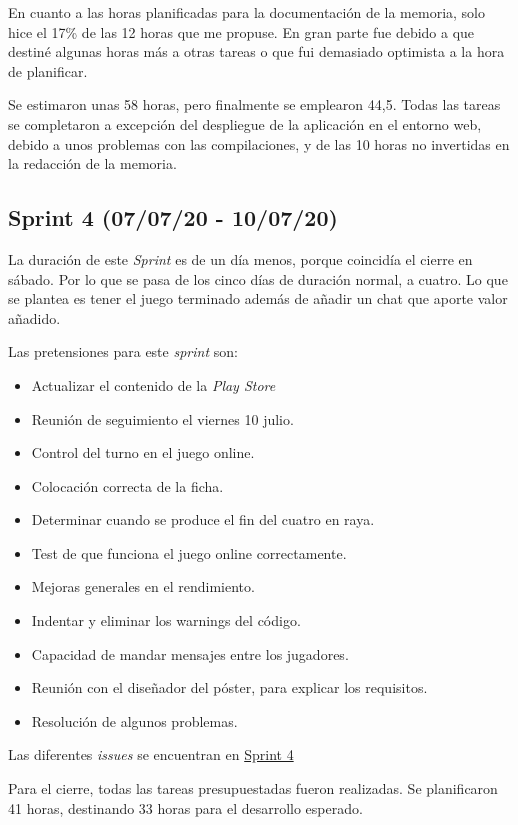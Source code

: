 En cuanto a las horas planificadas para la documentación de la memoria, solo hice el 17\% de las 12 horas que me propuse. En gran parte fue debido a que destiné algunas horas más a otras tareas o que fui demasiado optimista a la hora de planificar.

Se estimaron unas 58 horas, pero finalmente se emplearon 44,5. Todas las tareas se completaron a excepción del despliegue de la aplicación en el entorno web, debido a unos problemas con las compilaciones, y de las 10 horas no invertidas en la redacción de la memoria.

\subsection{Sprint 4 (07/07/20 - 10/07/20)}\label{sprint-4-070720---100720}
La duración de este \emph{Sprint} es de un día menos, porque coincidía el cierre en sábado. Por lo que se pasa de los cinco días de duración normal, a cuatro. Lo que se plantea es tener el juego terminado además de añadir un chat que aporte valor añadido.

Las pretensiones para este \emph{sprint} son:
\begin{itemize}
	\item Actualizar el contenido de la \emph{Play Store}
	\item Reunión de seguimiento el viernes 10 julio.
	\item Control del turno en el juego online.
	\item Colocación correcta de la ficha.
	\item Determinar cuando se produce el fin del cuatro en raya.
	\item Test de que funciona el juego online correctamente.
	\item Mejoras generales en el rendimiento.
	\item Indentar y eliminar los warnings del código.
	\item Capacidad de mandar mensajes entre los jugadores.
	\item Reunión con el diseñador del póster, para explicar los requisitos.
	\item Resolución de algunos problemas.
\end{itemize}

Las diferentes \emph{issues} se encuentran en \href{https://github.com/scc0034/flutter_serpiente/milestone/4?closed=1}{Sprint 4}


Para el cierre, todas las tareas presupuestadas fueron realizadas. Se planificaron 41 horas, destinando 33 horas para el desarrollo esperado.

